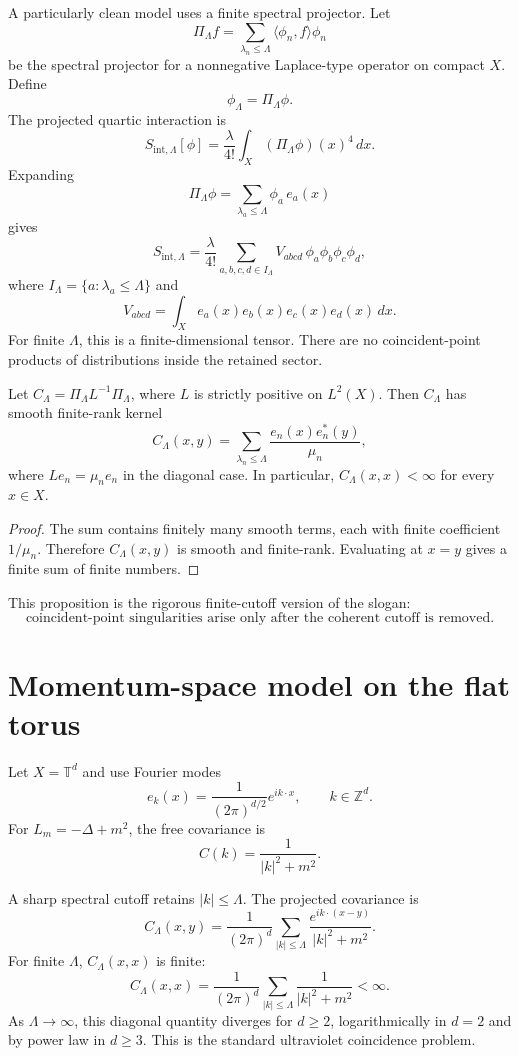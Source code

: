 \documentclass[11pt]{article}
\begin{document}
A particularly clean model uses a finite spectral projector.  Let
\[
\Pi_\Lambda f
=
\sum_{\lambda_n\le\Lambda}\langle\phi_n,f\rangle\phi_n
\]
be the spectral projector for a nonnegative Laplace-type operator on compact \(X\).  Define
\[
\phi_\Lambda=\Pi_\Lambda\phi .
\]
The projected quartic interaction is
\[
S_{\mathrm{int},\Lambda}[\phi]
=
\frac{\lambda}{4!}\int_X(\Pi_\Lambda\phi)(x)^4\,dx .
\]
Expanding
\[
\Pi_\Lambda\phi=\sum_{\lambda_a\le\Lambda}\phi_a\,e_a(x)
\]
gives
\[
S_{\mathrm{int},\Lambda}
=
\frac{\lambda}{4!}
\sum_{a,b,c,d\in I_\Lambda}
V_{abcd}\,\phi_a\phi_b\phi_c\phi_d,
\]
where \(I_\Lambda=\{a:\lambda_a\le\Lambda\}\) and
\[
V_{abcd}=\int_X e_a(x)e_b(x)e_c(x)e_d(x)\,dx .
\]
For finite \(\Lambda\), this is a finite-dimensional tensor.  There are no coincident-point
products of distributions inside the retained sector.

\begin{proposition}
Let \(C_\Lambda=\Pi_\Lambda L^{-1}\Pi_\Lambda\), where \(L\) is strictly positive on
\(L^2(X)\).  Then \(C_\Lambda\) has smooth finite-rank kernel
\[
C_\Lambda(x,y)=\sum_{\lambda_n\le\Lambda}\frac{e_n(x)e_n^\ast(y)}{\mu_n},
\]
where \(L e_n=\mu_n e_n\) in the diagonal case.  In particular, \(C_\Lambda(x,x)<\infty\)
for every \(x\in X\).
\end{proposition}

\begin{proof}
The sum contains finitely many smooth terms, each with finite coefficient \(1/\mu_n\).
Therefore \(C_\Lambda(x,y)\) is smooth and finite-rank.  Evaluating at \(x=y\) gives a finite
sum of finite numbers.
\end{proof}

This proposition is the rigorous finite-cutoff version of the slogan:
\[
\boxed{\text{coincident-point singularities arise only after the coherent cutoff is removed}.}
\]

\section{Momentum-space model on the flat torus}

Let \(X=\mathbb T^d\) and use Fourier modes
\[
e_k(x)=\frac{1}{(2\pi)^{d/2}}e^{ik\cdot x},
\qquad k\in\mathbb Z^d.
\]
For \(L_m=-\Delta+m^2\), the free covariance is
\[
C(k)=\frac{1}{|k|^2+m^2}.
\]

A sharp spectral cutoff retains \(|k|\le\Lambda\).  The projected covariance is
\[
C_\Lambda(x,y)=\frac{1}{(2\pi)^d}
\sum_{|k|\le\Lambda}
\frac{e^{ik\cdot(x-y)}}{|k|^2+m^2}.
\]
For finite \(\Lambda\), \(C_\Lambda(x,x)\) is finite:
\[
C_\Lambda(x,x)=\frac{1}{(2\pi)^d}
\sum_{|k|\le\Lambda}
\frac{1}{|k|^2+m^2}<\infty .
\]
As \(\Lambda\to\infty\), this diagonal quantity diverges for \(d\ge2\), logarithmically in
\(d=2\) and by power law in \(d\ge3\).  This is the standard ultraviolet coincidence problem.
\end{document}
